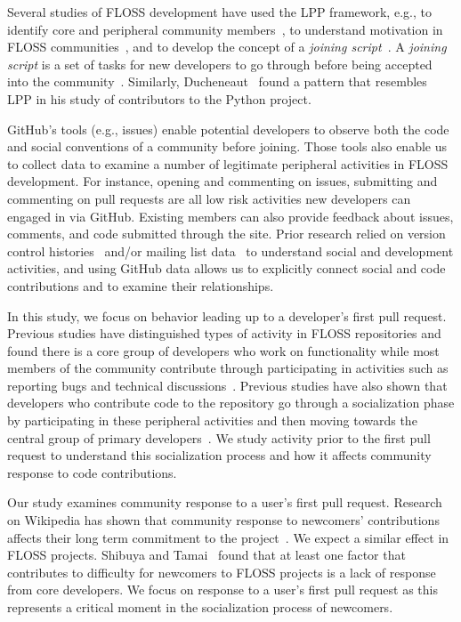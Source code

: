 \documentclass{sigchi}
\begin{document}
Several studies of FLOSS development have used the LPP framework, e.g., to
identify core and peripheral community members~\cite{huang_mining_2005}, to
understand motivation in FLOSS communities~\cite{ye_toward_2003}, and to develop
the concept of a \textit{joining script}~\cite{von_krogh_community_2003}. A
\textit{joining script} is a set of tasks for new developers to go through
before being accepted into the community~\cite{von_krogh_community_2003}.
Similarly, Ducheneaut~\cite{ducheneaut_socialization_2005} found a pattern that
resembles LPP in his study of contributors to the Python project.

GitHub's tools (e.g., issues) enable potential developers to observe both the
code and social conventions of a community before joining. Those tools also
enable us to collect data to examine a number of legitimate peripheral
activities in FLOSS development. For instance, opening and commenting on issues,
submitting and commenting on pull requests are all low risk activities new
developers can engaged in via GitHub. Existing members can also provide feedback
about issues, comments, and code submitted through the site. Prior research
relied on version control histories~\cite{huang_mining_2005} and/or mailing list
data~ \cite{ducheneaut_socialization_2005, von_krogh_community_2003} to
understand social and development activities, and using GitHub data allows us to
explicitly connect social and code contributions and to examine their
relationships.

In this study, we focus on behavior leading up to a developer's first pull
request.  Previous studies have distinguished types of activity in FLOSS
repositories and found there is a core group of developers who work on
functionality while most members of the community contribute through
participating in activities such as reporting bugs and technical
discussions~\cite{dinh2005freebsd, mockus2002two}. Previous studies have also
shown that developers who contribute code to the repository go through a
socialization phase by participating in these peripheral activities and then
moving towards the central group of primary
developers~\cite{ducheneaut_socialization_2005, von_krogh_community_2003}. We
study activity prior to the first pull request to understand this socialization
process and how it affects community response to code contributions.

Our study examines community response to a user's first pull request. Research
on Wikipedia has shown that community response to newcomers' contributions
affects their long term commitment to the project~\cite{choi2010socialization}.
We expect a similar effect in FLOSS projects. Shibuya and
Tamai~\cite{shibuya2009understanding} found that at least one factor that
contributes to difficulty for newcomers to FLOSS projects is a lack of response
from core developers. We focus on response to a user's first pull request as
this represents a critical moment in the socialization process of newcomers.
\end{document}
